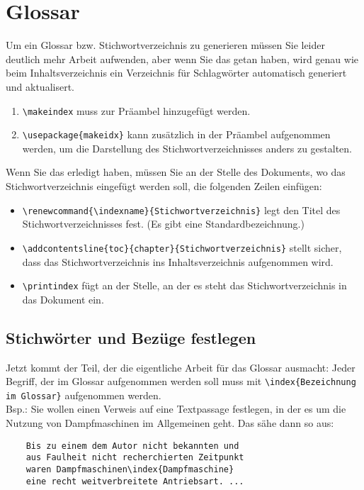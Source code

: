 \section{Glossar}

Um ein Glossar bzw. Stichwortverzeichnis zu generieren müssen Sie leider deutlich mehr Arbeit aufwenden, aber wenn Sie das getan haben, wird genau wie beim Inhaltsverzeichnis ein Verzeichnis für Schlagwörter automatisch generiert und aktualisert.\\

\begin{enumerate}
	\item \verb|\makeindex| muss zur Präambel hinzugefügt werden.
	\item \verb|\usepackage{makeidx}| kann zusätzlich in der Präambel aufgenommen werden, um die Darstellung des Stichwortverzeichnisses anders zu gestalten.
\end{enumerate}

Wenn Sie das erledigt haben, müssen Sie an der Stelle des Dokuments, wo das Stichwortverzeichnis eingefügt werden soll, die folgenden Zeilen einfügen:

\begin{itemize}
	\item \verb|\renewcommand{\indexname}{Stichwortverzeichnis}| legt den Titel des Stichwortverzeichnisses fest. (Es gibt eine Standardbezeichnung.)
	\item \verb|\addcontentsline{toc}{chapter}{Stichwortverzeichnis}| stellt sicher, dass das Stichwortverzeichnis ins Inhaltsverzeichnis aufgenommen wird.
	\item \verb|\printindex| fügt an der Stelle, an der es steht das Stichwortverzeichnis in das Dokument ein.
\end{itemize}

\subsection{Stichwörter und Bezüge festlegen}

Jetzt kommt der Teil, der die eigentliche Arbeit für das Glossar ausmacht: Jeder Begriff, der im Glossar aufgenommen werden soll muss mit \verb|\index{Bezeichnung im Glossar}| aufgenommen werden.\\

Bsp.: Sie wollen einen Verweis auf eine Textpassage festlegen, in der es um die Nutzung von Dampfmaschinen im Allgemeinen geht. Das sähe dann so aus:

\begin{verbatim}
	Bis zu einem dem Autor nicht bekannten und 
	aus Faulheit nicht recherchierten Zeitpunkt 
	waren Dampfmaschinen\index{Dampfmaschine} 
	eine recht weitverbreitete Antriebsart. ...
\end{verbatim}

